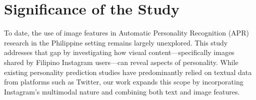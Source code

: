 




\section{Significance of the Study}
\label{sec: Significance}

To date, the use of image features in Automatic Personality Recognition (APR) research in the Philippine setting remains largely unexplored. This study addresses that gap by investigating how visual content—specifically images shared by Filipino Instagram users—can reveal aspects of personality. While existing personality prediction studies have predominantly relied on textual data from platforms such as Twitter, our work expands this scope by incorporating Instagram’s multimodal nature and combining both text and image features.

